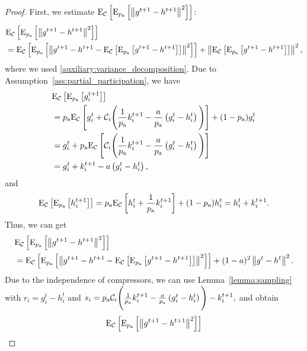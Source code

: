\documentclass{article}
\newcommand*{\probavailable}{\ensuremath{p_{\textnormal{a}}}}
\begin{document}
\begin{proof}
  First, we estimate $\ExpSub{\cC}{\ExpSub{\probavailable}{\norm{g^{t+1} - h^{t+1}}^2}}$:
  \begin{align*}
      &\ExpSub{\cC}{\ExpSub{\probavailable}{\norm{g^{t+1} - h^{t+1}}^2}} \\
      &=\ExpSub{\cC}{\ExpSub{\probavailable}{\norm{g^{t+1} - h^{t+1} - \ExpSub{\cC}{\ExpSub{\probavailable}{g^{t+1} - h^{t+1}}}}^2}} + \norm{\ExpSub{\cC}{\ExpSub{\probavailable}{g^{t+1} - h^{t+1}}}}^2,
  \end{align*}
  where we used \eqref{auxiliary:variance_decomposition}.
  Due to Assumption~\ref{ass:partial_participation}, we have
  \begin{align*}
      &\ExpSub{\cC}{\ExpSub{\probavailable}{g^{t+1}_i}} \\
      &=\probavailable \ExpSub{\cC}{g^{t}_i + \cC_i\Bigg(\frac{1}{\probavailable}k^{t+1}_i - \frac{a}{\probavailable} \left(g^{t}_i - h^{t}_i\right)\Bigg)} + (1 - \probavailable) g^{t}_i \\
      &=g^{t}_i  + \probavailable\ExpSub{\cC}{\cC_i\Bigg(\frac{1}{\probavailable}k^{t+1}_i - \frac{a}{\probavailable} \left(g^{t}_i - h^{t}_i\right)\Bigg)} \\
      &=g^{t}_i  + k^{t+1}_i - a \left(g^{t}_i - h^{t}_i\right), \\
  \end{align*}
  and 
  \begin{align*}
      &\ExpSub{\cC}{\ExpSub{\probavailable}{h^{t+1}_i}} = \probavailable \ExpSub{\cC}{h^t_i + \frac{1}{\probavailable}k^{t+1}_i} + (1 - \probavailable) h^{t}_i = h^{t}_i + k^{t+1}_i. \\
  \end{align*}
  Thus, we can get
  \begin{align*}
      &\ExpSub{\cC}{\ExpSub{\probavailable}{\norm{g^{t+1} - h^{t+1}}^2}} \\
      &=\ExpSub{\cC}{\ExpSub{\probavailable}{\norm{g^{t+1} - h^{t+1} - \ExpSub{\cC}{\ExpSub{\probavailable}{g^{t+1} - h^{t+1}}}}^2}} + (1 - a)^2\norm{g^{t} - h^{t}}^2.
  \end{align*}
  Due to the independence of compressors, we can use Lemma~\ref{lemma:sampling} with $r_i = g^{t}_i - h^{t}_i$ and $s_i = \probavailable\cC_i\Bigg(\frac{1}{\probavailable}k^{t+1}_i - \frac{a}{\probavailable} \left(g^{t}_i - h^{t}_i\right)\Bigg) - k^{t+1}_i,$ and obtain
  \begin{align*}
    &\ExpSub{\cC}{\ExpSub{\probavailable}{\norm{g^{t+1} - h^{t+1}}^2}} \\

\end{align*}
\end{proof}
\end{document}
